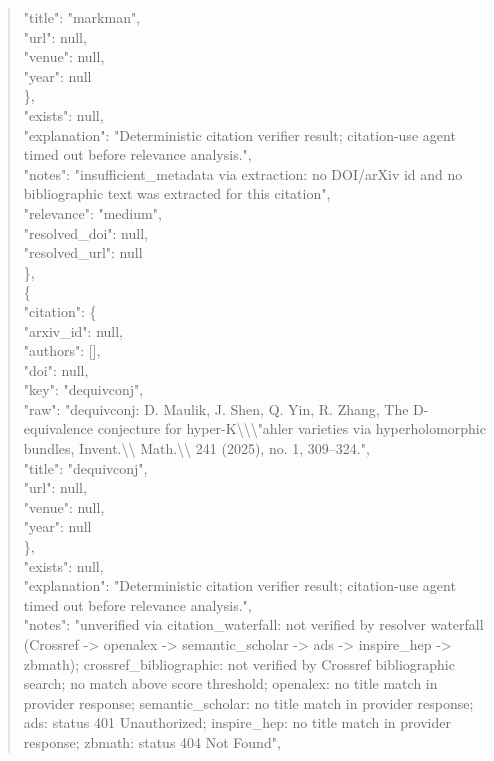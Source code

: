 \documentclass[11pt]{article}
\begin{document}
\begin{quote}
        "title": "markman",\\
        "url": null,\\
        "venue": null,\\
        "year": null\\
      \},\\
      "exists": null,\\
      "explanation": "Deterministic citation verifier result; citation-use agent timed out before relevance analysis.",\\
      "notes": "insufficient\_metadata via extraction: no DOI/arXiv id and no bibliographic text was extracted for this citation",\\
      "relevance": "medium",\\
      "resolved\_doi": null,\\
      "resolved\_url": null\\
    \},\\
    \{\\
      "citation": \{\\
        "arxiv\_id": null,\\
        "authors": [],\\
        "doi": null,\\
        "key": "dequivconj",\\
        "raw": "dequivconj: D. Maulik, J. Shen, Q. Yin, R. Zhang, The D-equivalence conjecture for hyper-K\textbackslash{}\textbackslash{}\textbackslash{}"ahler varieties via hyperholomorphic bundles, Invent.\textbackslash{}\textbackslash{} Math.\textbackslash{}\textbackslash{} 241 (2025), no. 1, 309--324.",\\
        "title": "dequivconj",\\
        "url": null,\\
        "venue": null,\\
        "year": null\\
      \},\\
      "exists": null,\\
      "explanation": "Deterministic citation verifier result; citation-use agent timed out before relevance analysis.",\\
      "notes": "unverified via citation\_waterfall: not verified by resolver waterfall (Crossref -> openalex -> semantic\_scholar -> ads -> inspire\_hep -> zbmath); crossref\_bibliographic: not verified by Crossref bibliographic search; no match above score threshold; openalex: no title match in provider response; semantic\_scholar: no title match in provider response; ads: status 401 Unauthorized; inspire\_hep: no title match in provider response; zbmath: status 404 Not Found",\\

\end{quote}
\end{document}
